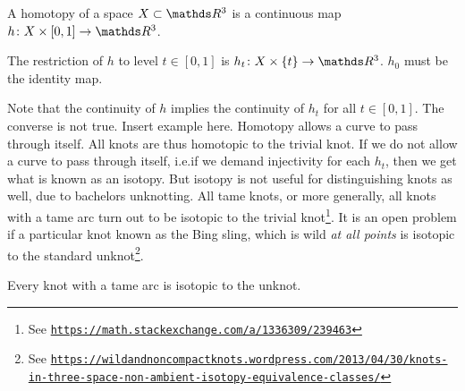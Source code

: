 \begin{defn}[Homotopy]
    A homotopy of a space \(X \subset \rthree\) is a continuous map \(h \colon X \times [0, 1] \rightarrow \rthree\).

    The restriction of \(h\) to level \(t \in [0, 1]\) is \(h_t \colon X \times \{t\} \rightarrow \rthree\). \(h_0\) must be the identity map.
\end{defn}
Note that the continuity of \(h\) implies the continuity of \(h_t\) for all \(t \in [0,1]\). The converse is not true. Insert example here. Homotopy allows a curve to pass through itself. All knots are thus homotopic to the trivial knot. If we do not allow a curve to pass through itself, i.e.\@ if we demand injectivity for each \(h_t\), then we get what is known as an isotopy. But isotopy is not useful for distinguishing knots as well, due to bachelors unknotting. All tame knots, or more generally, all knots with a tame arc turn out to be isotopic to the trivial knot\footnote{See \texttt{\url{https://math.stackexchange.com/a/1336309/239463}}}. It is an open problem if a particular knot known as the Bing sling, which is wild \textit{at all points} is isotopic to the standard unknot\footnote{See \texttt{\url{https://wildandnoncompactknots.wordpress.com/2013/04/30/knots-in-three-space-non-ambient-isotopy-equivalence-classes/}}}.
\begin{prop}
    Every knot with a tame arc is isotopic to the unknot.
\end{prop}
